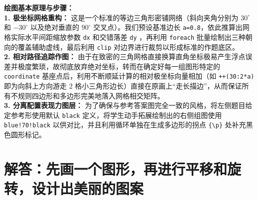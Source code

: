 {\small\color{blue!70!black}
\textbf{绘图基本原理与步骤：}\\
\textbf{1. 极坐标网格重构：} 这是一个标准的等边三角形密铺网络（斜向夹角分别为 $30^\circ$ 和 $-30^\circ$ 以及绝对垂直的 $90^\circ$ 交叉点）。我们预设基准边长 \texttt{a=0.8}，依此推算出网格实际水平间距缩放参数 \texttt{dx} 和交错落差 \texttt{dy} ，再利用 \texttt{foreach} 批量绘制出三种朝向的覆盖辅助虚线，最后利用 \texttt{clip} 对边界进行裁剪以形成标准的作题底区。\\
\textbf{2. 相对路径追踪作图：} 由于在致密的三角网格直接换算直角坐标极易产生浮点误差并极度繁琐，故彻底放弃绝对坐标，转而在确定好每一组图形特定的 \texttt{coordinate} 基座点后，利用不断顺延计算的相对极坐标向量相加（如 \texttt{++(30:2*a)} 即为向斜上方向游走 2 格小三角形边长）直接在原画上“走长描边”，从而保证所有不规则四边形和多边形完美地落入网格相交矩阵。\\
\textbf{3. 分离配置表现力图层：} 为了确保与参考答案图完全一致的风格，将左侧题目给定参考形使用默认 \texttt{black} 定义，将学生动手拓展绘制出的右侧组图使用 \texttt{blue!70!black} 以供对比，并且利用循环单独在生成多边形的拐点 \texttt{\{\textbackslash{}p\}} }处补充黑色圆形标记。%
\newpage



\section{解答：先画一个图形，再进行平移和旋转，设计出美丽的图案}

\vspace{0.6cm}

